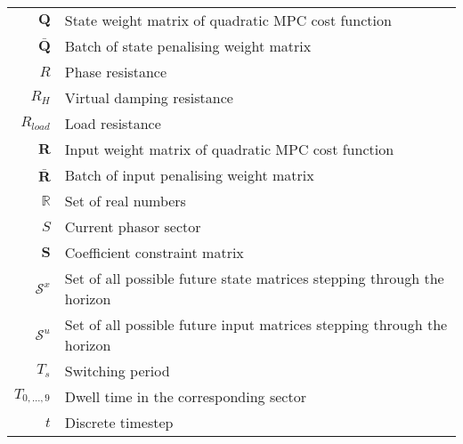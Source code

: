 \begin{scriptsize}
\begin{tabularx}{\textwidth}{r|X}
  $\textbf{Q}$                & State weight matrix of quadratic MPC cost function\\
    $\bar{\textbf{Q}}$                    & Batch of state penalising weight matrix\\
  
  $R$                               & Phase resistance\\
  $R_H$                             & Virtual damping resistance\\
  $R_{load}$                        & Load resistance\\
  $\textbf{R}$                & Input weight matrix of quadratic MPC cost function\\
  $\bar{\textbf{R}}$                    & Batch of input penalising weight matrix\\
  $\mathbb{R}$                      & Set of real numbers\\
  
  $S$                               & Current phasor sector\\
  $\textbf{S}$                  & Coefficient constraint matrix\\
  $\mathcal{S}^x$             & Set of all possible future state matrices stepping through the horizon\\
  $\mathcal{S}^u$             & Set of all possible future input matrices stepping through the horizon\\
  
  $T_s$                             & Switching period\\
  $T_{0,\dots,9}$                   & Dwell time in the corresponding sector\\
  $t$                               & Discrete timestep\\
  

\end{tabularx}
\end{scriptsize}
